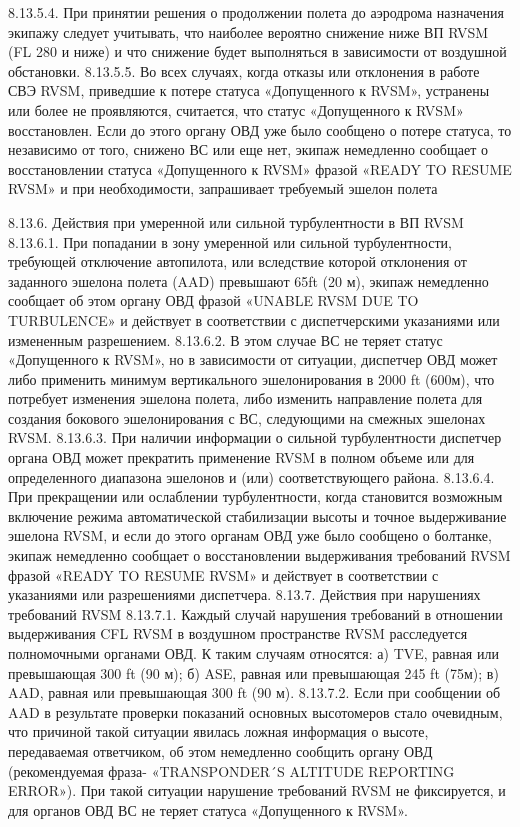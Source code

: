 8.13.5.4. При принятии решения о продолжении полета до аэродрома назначения экипажу следует учитывать, что наиболее вероятно снижение ниже ВП RVSM (FL 280 и ниже) и что снижение будет выполняться в зависимости от воздушной обстановки.
8.13.5.5. Во всех случаях, когда отказы или отклонения в работе СВЭ RVSM, приведшие к потере статуса «Допущенного к RVSM», устранены или более не проявляются, считается, что статус «Допущенного к RVSM» восстановлен. Если до этого органу ОВД уже было сообщено о потере статуса, то независимо от того, снижено ВС или еще нет, экипаж немедленно сообщает о восстановлении статуса «Допущенного к RVSM» фразой «READY TO RESUME RVSM» и при необходимости, запрашивает требуемый эшелон полета


8.13.6.	Действия при умеренной или сильной турбулентности в ВП RVSM
8.13.6.1. При попадании в зону умеренной или сильной турбулентности, требующей отключение автопилота, или вследствие которой отклонения от заданного эшелона полета (AAD) превышают 65ft (20 м), экипаж немедленно сообщает об этом органу ОВД фразой «UNABLE RVSM DUE TO TURBULENCE» и действует в соответствии с диспетчерскими указаниями или измененным разрешением.
8.13.6.2. В этом случае ВС не теряет статус «Допущенного к RVSM», но в зависимости от ситуации, диспетчер ОВД может либо применить минимум вертикального эшелонирования в 2000 ft (600м), что потребует изменения эшелона полета, либо изменить направление полета для создания бокового эшелонирования с ВС, следующими на смежных эшелонах RVSM.
8.13.6.3. При наличии информации о сильной турбулентности диспетчер органа ОВД может прекратить применение RVSM в полном объеме или для определенного диапазона эшелонов и (или) соответствующего района.
8.13.6.4. При прекращении или ослаблении турбулентности, когда становится возможным включение режима автоматической стабилизации высоты и точное выдерживание эшелона RVSM, и если до этого органам ОВД уже было сообщено о болтанке, экипаж немедленно сообщает о восстановлении выдерживания требований RVSM фразой «READY TO RESUME RVSM» и действует в соответствии с указаниями или разрешениями диспетчера.
8.13.7.	Действия при нарушениях требований RVSM
8.13.7.1. Каждый случай нарушения требований в отношении выдерживания CFL RVSM в воздушном пространстве RVSM расследуется полномочными органами ОВД. К таким случаям относятся:
а)	TVE, равная или превышающая 300 ft (90 м);
б)	ASE, равная или превышающая 245 ft (75м);
в)	AAD, равная или превышающая 300 ft (90 м).
8.13.7.2. Если при сообщении об AAD в результате проверки показаний основных высотомеров стало очевидным, что причиной такой ситуации явилась ложная информация о высоте, передаваемая ответчиком, об этом немедленно сообщить органу ОВД (рекомендуемая фраза- «TRANSPONDER´S ALTITUDE REPORTING ERROR»). При такой ситуации нарушение требований RVSM не фиксируется, и для органов ОВД ВС не теряет статуса «Допущенного к RVSM».
